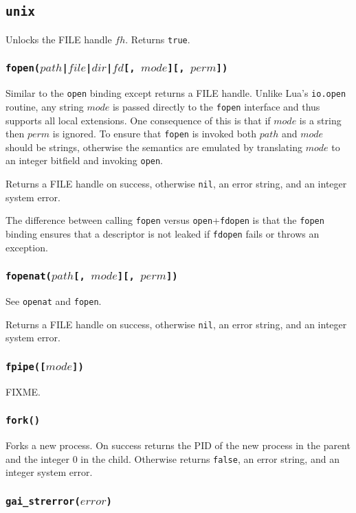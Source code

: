 \documentclass[11pt, oneside]{memoir}
\newcommand*{\true}[0]{\texttt{true}\xspace}
\newcommand*{\false}[0]{\texttt{false}\xspace}
\newcommand*{\nil}[0]{\texttt{nil}\xspace}
\newcommand*{\syscall}[1]{\texttt{#1}\xspace}
\newcommand*{\fn}[1]{\texttt{#1}\xspace}
\newcounter{toccols}
\newenvironment{Module}[1]{
	\subsection{\texttt{#1}}
	\addtocontents{toc}{
		\protect\begin{multicols}{\value{toccols}}
	}
}{
	\addtocontents{toc}{\protect\end{multicols}}
}
\begin{document}
\begin{Module}{unix}
Unlocks the FILE handle $fh$. Returns \true.

\subsubsection[\fn{fopen}]{\fn{fopen($path$|$file$|$dir$|$fd$[, $mode$][, $perm$])}}

Similar to the \syscall{open} binding except returns a FILE handle. Unlike Lua's \texttt{io.open} routine,
any string $mode$ is passed directly to the \syscall{fopen} interface and thus supports all local extensions. One consequence of this is that if $mode$ is a string then $perm$ is ignored. To ensure that \syscall{fopen} is invoked both $path$ and $mode$ should be strings, otherwise the semantics are emulated by translating $mode$ to an integer bitfield and invoking \syscall{open}.

Returns a FILE handle on success, otherwise \nil, an error string, and an integer system error.

The difference between calling \syscall{fopen} versus \syscall{open}+\syscall{fdopen} is that the \syscall{fopen} binding ensures that a descriptor is not leaked if \syscall{fdopen} fails or throws an exception.

\subsubsection[\fn{fopenat}]{\fn{fopenat($path$[, $mode$][, $perm$])}}

See \syscall{openat} and \syscall{fopen}.

Returns a FILE handle on success, otherwise \nil, an error string, and an integer system error.

\subsubsection[\fn{fpipe}]{\fn{fpipe([$mode$])}}

FIXME.

\subsubsection[\fn{fork}]{\fn{fork()}}

Forks a new process. On success returns the PID of the new process in the parent and the integer 0 in the child. Otherwise returns \false, an error string, and an integer system error.

\subsubsection[\fn{gai\_strerror}]{\fn{gai\_strerror($error$)}}


\end{Module}
\end{document}
